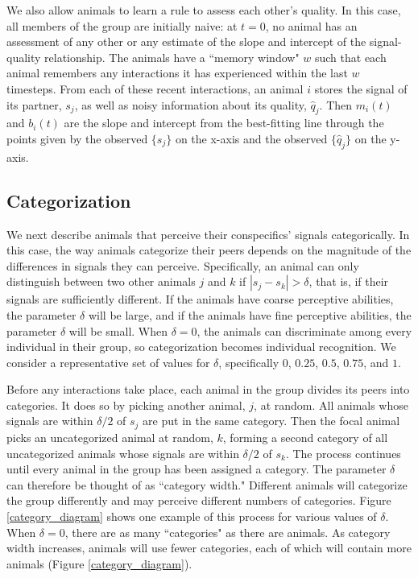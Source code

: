 We also allow animals to learn a rule to assess each other's quality. In this case, all members of the group are initially naive: at $t=0$, no animal has an assessment of any other or any estimate of the slope and intercept of the signal-quality relationship. The animals have a ``memory window" $w$ such that each animal remembers any interactions it has experienced within the last $w$ timesteps. From each of these recent interactions, an animal $i$ stores the signal of its partner, $s_j$, as well as noisy information about its quality, $\hat{q}_j$.  Then $m_i(t)$ and $b_i(t)$ are the slope and intercept from the best-fitting line through the points given by the observed $\{s_j\}$ on the x-axis and the observed $\{\hat{q}_j\}$ on the y-axis.   

\subsection*{Categorization}
We next describe animals that perceive their conspecifics' signals categorically. In this case, the way animals categorize their peers depends on the magnitude of the differences in signals they can perceive. Specifically, an animal can only distinguish between two other animals $j$ and $k$ if $|s_j-s_k|>\delta$, that is, if their signals are sufficiently different. If the animals have coarse perceptive abilities, the parameter $\delta$ will be large, and if the animals have fine perceptive abilities, the parameter $\delta$ will be small. When $\delta=0$, the animals can discriminate among every individual in their group, so categorization becomes individual recognition. We consider a representative set of values for $\delta$, specifically $0$, $0.25$, $0.5$, $0.75$, and $1$.

Before any interactions take place, each animal in the group divides its peers into categories. It does so by picking another animal, $j$, at random. All animals whose signals are within $\delta/2$ of $s_j$ are put in the same category. Then the focal animal picks an uncategorized animal at random, $k$, forming a second category of all uncategorized animals whose signals are within $\delta/2$ of $s_k$. The process continues until every animal in the group has been assigned a category. The parameter $\delta$ can therefore be thought of as ``category width."  Different animals will categorize the group differently and may perceive different numbers of categories. Figure \ref{category_diagram} shows one example of this process for various values of $\delta$. When $\delta=0$, there are as many ``categories" as there are animals. As category width increases, animals will use fewer categories, each of which will contain more animals  (Figure \ref{category_diagram}). 

